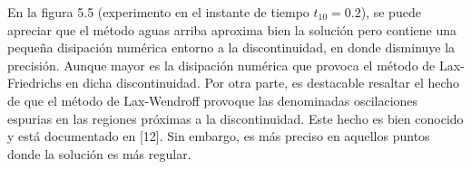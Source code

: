 En la figura 5.5 (experimento en el instante de tiempo $t_10=0.2$),
se puede apreciar que el método aguas arriba aproxima bien la
solución pero contiene una pequeña disipación numérica entorno a la
discontinuidad, en donde disminuye la precisión.
Aunque mayor es la disipación numérica que provoca el método de
Lax-Friedrichs en dicha discontinuidad.
Por otra parte, es destacable resaltar el hecho de que el método de
Lax-Wendroff provoque las denominadas oscilaciones espurias en las
regiones próximas a la discontinuidad.
Este hecho es bien conocido y está documentado en [12].
Sin embargo, es más preciso en aquellos puntos donde la solución es
más regular.